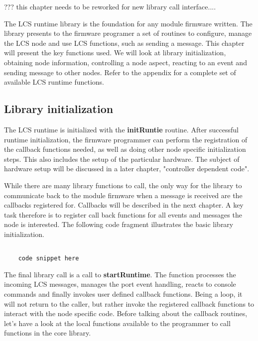 ??? this chapter needs to be reworked for new library call interface....

The LCS runtime library is the foundation for any module firmware written. The library presents to the firmware programer a set of routines to configure, manage the LCS node and use LCS functions, such as sending a message. This chapter will present the key functions used. We will look at library initialization, obtaining node information, controlling a node aspect, reacting to an event and sending message to other nodes.
Refer to the appendix for a complete set of available LCS runtime functions.

\subsection{Library initialization}

The LCS runtime is initialized with the \textbf{initRuntie} routine. After successful runtime initialization, the firmware programmer can perform the registration of the callback functions needed, as well as doing other node specific initialization steps. This also includes the setup of the particular hardware. The subject of hardware setup will be discussed in a later chapter, "controller dependent code". 

While there are many library functions to call, the only way for the library to communicate back to the module firmware when a message is received are the callbacks registered for. Callbacks will be described in the next chapter. A key task therefore is to register call back functions for all events and messages the node is interested. The following code fragment illustrates the basic library initialization.

\lstset{language=c++, style=codesnippetstyle}
\begin{lstlisting}
   
    code snippet here

\end{lstlisting}
\FloatBarrier


The final library call is a call to \textbf{startRuntime}. The function processes the incoming LCS messages, manages the port event handling, reacts to console commands and finally invokes user defined callback functions. Being a loop, it will not return to the caller, but rather invoke the registered callback functions to interact with the node specific code. Before talking about the callback routines, let's have a look at the local functions available to the  programmer to call functions in the core library.

